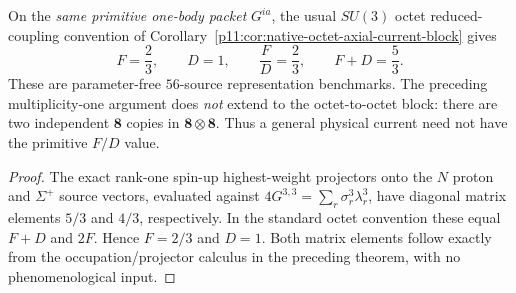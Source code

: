 \documentclass[12pt,a4paper]{article}
\begin{document}
\begin{corollary}
\label{p11:cor:v371-primitive-octet-FD}
On the \emph{same primitive one-body packet} $G^{ia}$, the
usual $SU(3)$ octet reduced-coupling convention of
Corollary~\ref{p11:cor:native-octet-axial-current-block}
gives
\[
 \boxed{F=\frac23,\qquad D=1,\qquad \frac FD=\frac23,
 \qquad F+D=\frac53.}
\]
These are parameter-free $56$-source representation benchmarks.
The preceding multiplicity-one argument does \emph{not} extend to the
octet-to-octet block: there are two independent $\mathbf8$ copies in
$\mathbf8\otimes\mathbf8$.  Thus a general physical current need
not have the primitive $F/D$ value.
\end{corollary}
\begin{proof}
The exact rank-one spin-up highest-weight projectors onto the
$N$ proton and $\Sigma^+$ source vectors, evaluated against
$4G^{3,3}=\sum_r\sigma_r^3\lambda_r^3$, have diagonal
matrix elements $5/3$ and $4/3$, respectively.  In the standard
octet convention these equal $F+D$ and $2F$.  Hence
$F=2/3$ and $D=1$.  Both matrix elements follow exactly from
the occupation/projector calculus in the preceding theorem, with
no phenomenological input.
\end{proof}
\end{document}
